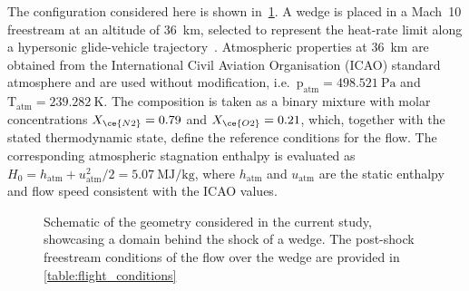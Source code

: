 
The configuration considered here is shown in~\cref{figure:schematicflow}. A wedge is placed in a Mach~10 freestream at an altitude of 36~km, selected to represent the heat-rate limit along a hypersonic glide-vehicle trajectory~\cite{Rizvi2015}. Atmospheric properties at 36~km are obtained from the International Civil Aviation Organisation (ICAO) standard atmosphere and are used without modification, i.e.\ $\mathrm{p}_{\mathrm{atm}} = 498.521~\mathrm{Pa}$ and $\mathrm{T}_{\mathrm{atm}} = 239.282~\mathrm{K}$. The composition is taken as a binary mixture with molar concentrations $X_{\ce{N2}}=0.79$ and $X_{\ce{O2}}=0.21$, which, together with the stated thermodynamic state, define the reference conditions for the flow. The corresponding atmospheric stagnation enthalpy is evaluated as $H_{0}=h_{\mathrm{atm}}+u_{\mathrm{atm}}^{2}/2=5.07~\mathrm{MJ/kg}$, where $h_{\mathrm{atm}}$ and $u_{\mathrm{atm}}$ are the static enthalpy and flow speed consistent with the ICAO values.


\begin{figure}[ht]
    \centering
    \fontsize{8}{10}\selectfont
    \caption{ Schematic of the geometry considered in the current study, showcasing a domain behind the shock of a wedge. The post-shock freestream conditions of the flow over the wedge are provided in \cref{table:flight_conditions}}
    \label{figure:schematicflow}
\end{figure}


